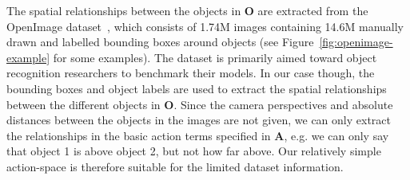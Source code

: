 \documentclass[a4paper, twoside]{article}
\begin{document}
The spatial relationships between the objects in $\mathbf{O}$ are extracted from the OpenImage dataset~\cite{openimages}, which consists of 1.74M images containing 14.6M manually drawn and labelled bounding boxes around objects (see Figure~\ref{fig:openimage-example} for some examples). The dataset is primarily aimed toward object recognition researchers to benchmark their models. In our case though, the bounding boxes and object labels are used to extract the spatial relationships between the different objects in $\mathbf{O}$. Since the camera perspectives and absolute distances between the objects in the images are not given, we can only extract the relationships in the basic action terms specified in $\mathbf{A}$, e.g. we can only say that object 1 is above object 2, but not how far above. Our relatively simple action-space is therefore suitable for the limited dataset information. 
\end{document}
